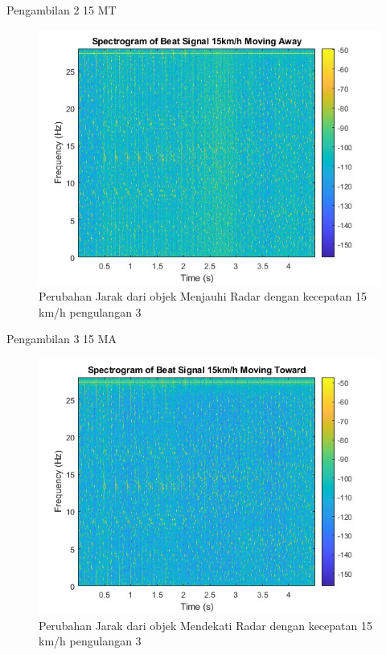 Pengambilan 2 15 MT

\begin{figure}
	\centering
	\includegraphics[scale=0.6]{pics/bab5/Velocity/3_15MA.jpg}
	\caption{Perubahan Jarak dari objek Menjauhi Radar dengan kecepatan 15 km/h pengulangan 3}
	\label{fig:pengambilan3_15MA}
\end{figure}

Pengambilan 3 15 MA

\begin{figure}
	\centering
	\includegraphics[scale=0.6]{pics/bab5/Velocity/3_15MT.jpg}
	\caption{Perubahan Jarak dari objek Mendekati Radar dengan kecepatan 15 km/h pengulangan 3}
	\label{fig:pengambilan3_15MT}
\end{figure}

